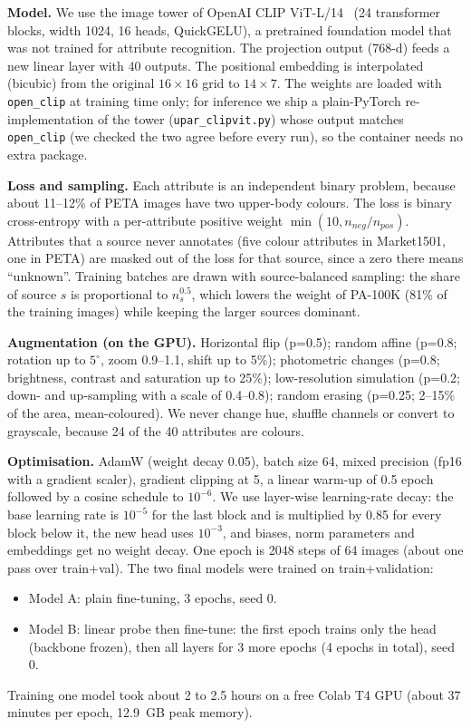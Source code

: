 \documentclass[a4paper, 10pt, conference]{ieeeconf}
\begin{document}
\textbf{Model.} We use the image tower of OpenAI CLIP ViT-L/14~\cite{radford2021clip} (24 transformer blocks, width 1024, 16 heads, QuickGELU), a pretrained foundation model that was not trained for attribute recognition. The projection output (768-d) feeds a new linear layer with 40 outputs. The positional embedding is interpolated (bicubic) from the original $16\times16$ grid to $14\times 7$. The weights are loaded with \texttt{open\_clip} at training time only; for inference we ship a plain-PyTorch re-implementation of the tower (\texttt{upar\_clipvit.py}) whose output matches \texttt{open\_clip} (we checked the two agree before every run), so the container needs no extra package.

\textbf{Loss and sampling.} Each attribute is an independent binary problem, because about 11--12\% of PETA images have two upper-body colours. The loss is binary cross-entropy with a per-attribute positive weight $\min(10, n_{neg}/n_{pos})$. Attributes that a source never annotates (five colour attributes in Market1501, one in PETA) are masked out of the loss for that source, since a zero there means ``unknown''. Training batches are drawn with source-balanced sampling: the share of source $s$ is proportional to $n_s^{0.5}$, which lowers the weight of PA-100K (81\% of the training images) while keeping the larger sources dominant.

\textbf{Augmentation (on the GPU).} Horizontal flip (p=0.5); random affine (p=0.8; rotation up to $5^\circ$, zoom 0.9--1.1, shift up to 5\%); photometric changes (p=0.8; brightness, contrast and saturation up to 25\%); low-resolution simulation (p=0.2; down- and up-sampling with a scale of 0.4--0.8); random erasing (p=0.25; 2--15\% of the area, mean-coloured). We never change hue, shuffle channels or convert to grayscale, because 24 of the 40 attributes are colours.

\textbf{Optimisation.} AdamW (weight decay 0.05), batch size 64, mixed precision (fp16 with a gradient scaler), gradient clipping at 5, a linear warm-up of 0.5 epoch followed by a cosine schedule to $10^{-6}$. We use layer-wise learning-rate decay: the base learning rate is $10^{-5}$ for the last block and is multiplied by 0.85 for every block below it, the new head uses $10^{-3}$, and biases, norm parameters and embeddings get no weight decay. One epoch is 2048 steps of 64 images (about one pass over train+val). The two final models were trained on train+validation:
\begin{itemize}
    \item Model A: plain fine-tuning, 3 epochs, seed 0.
    \item Model B: linear probe then fine-tune: the first epoch trains only the head (backbone frozen), then all layers for 3 more epochs (4 epochs in total), seed 0.
\end{itemize}
Training one model took about 2 to 2.5 hours on a free Colab T4 GPU (about 37 minutes per epoch, 12.9~GB peak memory).
\end{document}
